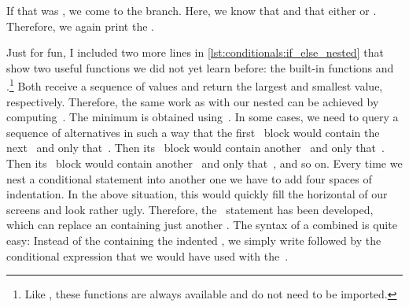 If that was , we come to the  branch.
Here, we know that  and that either  or .
Therefore, we again print the  .

Just for fun, I included two more lines in \cref{lst:conditionals:if_else_nested} that show two useful functions we did not yet learn before:
the built-in functions  and .\footnote{%
Like , these functions are always available and do not need to be imported.%
}
Both receive a sequence of values and return the largest and smallest value, respectively.
Therefore, the same work as with our nested  can be achieved by computing~.
The minimum is obtained using~.
\FloatBarrier%
\endhsection%
%
%
%
In some cases, we need to query a sequence of alternatives in such a way that the first ~block would contain the next~ and only that~.
Then its ~block would contain another~ and only that~.
Then its ~block would contain another~ and only that~, and so on.
Every time we nest a conditional statement into another one we have to add four spaces of indentation.
In the above situation, this would quickly fill the horizontal of our screens and look rather ugly.
Therefore, the ~statement has been developed, which can replace an  containing just another .
The syntax of a combined  is quite easy\cite{PSF:P3D:TPT:MCFT}:
Instead of the  containing the indented , we simply write  followed by the conditional expression that we would have used with the~.%
%
%
%
\FloatBarrier%
%
%
%
%
%
%
%
%
